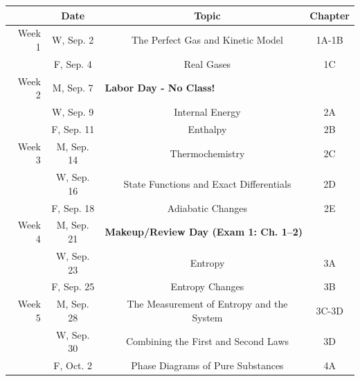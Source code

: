 \documentclass[12pt, letterpaper]{article}
\begin{document}
\begin{tabular}{rcccc}
	       & Date       &                                                                   & Topic                                     & Chapter \\
	\midrule
	Week 1 & W, Sep. 2  &                                                                   & The Perfect Gas and Kinetic Model         & 1A-1B   \\
	       & F, Sep. 4  &                                                                   & Real Gases                                & 1C      \\
	\midrule
	Week 2 & M, Sep. 7  & \multicolumn{3}{l}{\textbf{Labor Day - No Class!}}                                                                      \\
	       & W, Sep. 9  &                                                                   & Internal Energy                           & 2A      \\
	       & F, Sep. 11 &                                                                   & Enthalpy                                  & 2B      \\
	\midrule
	Week 3 & M, Sep. 14 &                                                                   & Thermochemistry                           & 2C      \\
	       & W, Sep. 16 &                                                                   & State Functions and Exact Differentials   & 2D      \\
	       & F, Sep. 18 &                                                                   & Adiabatic Changes                         & 2E      \\
	\midrule
	Week 4 & M, Sep. 21 & \multicolumn{3}{l}{\textbf{Makeup/Review Day (Exam 1: Ch. 1--2)}}                                                       \\
	       & W, Sep. 23 &                                                                   & Entropy                                   & 3A      \\
	       & F, Sep. 25 &                                                                   & Entropy Changes                           & 3B      \\
	\midrule
	Week 5 & M, Sep. 28 &                                                                   & The Measurement of Entropy and the System & 3C-3D   \\
	       & W, Sep. 30 &                                                                   & Combining the First and Second Laws       & 3D      \\
	       & F, Oct. 2  &                                                                   & Phase Diagrams of Pure Substances         & 4A      \\
\end{tabular}
\end{document}

